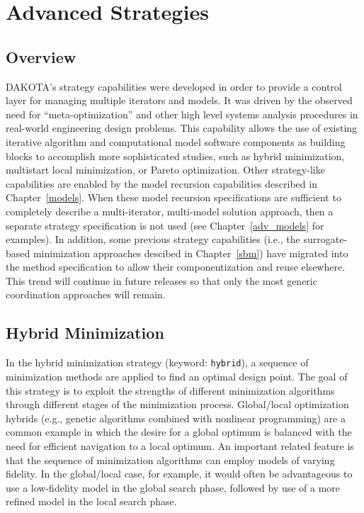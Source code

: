 \chapter{Advanced Strategies}\label{strat}

\section{Overview}\label{strat:overview}

DAKOTA's strategy capabilities were developed in order to provide a
control layer for managing multiple iterators and models. It was
driven by the observed need for ``meta-optimization'' and other high
level systems analysis procedures in real-world engineering design
problems. This capability allows the use of existing iterative
algorithm and computational model software components as building
blocks to accomplish more sophisticated studies, such as hybrid
minimization, multistart local minimization, or Pareto optimization.
Other strategy-like capabilities are enabled by the model recursion
capabilities described in Chapter~\ref{models}.  When these model
recursion specifications are sufficient to completely describe a
multi-iterator, multi-model solution approach, then a separate
strategy specification is not used (see Chapter~\ref{adv_models} for
examples).  In addition, some previous strategy capabilities (i.e.,
the surrogate-based minimization approaches descibed in
Chapter~\ref{sbm}) have migrated into the method specification to
allow their componentization and reuse elsewhere.  This trend will
continue in future releases so that only the most generic coordination
approaches will remain.

\section{Hybrid Minimization}\label{strat:hybrid}

In the hybrid minimization strategy (keyword: \texttt{hybrid}), a
sequence of minimization methods are applied to find an optimal design
point. The goal of this strategy is to exploit the strengths of
different minimization algorithms through different stages of the
minimization process. Global/local optimization hybrids (e.g., genetic
algorithms combined with nonlinear programming) are a common example
in which the desire for a global optimum is balanced with the need for
efficient navigation to a local optimum. An important related feature
is that the sequence of minimization algorithms can employ models of
varying fidelity. In the global/local case, for example, it would
often be advantageous to use a low-fidelity model in the global search
phase, followed by use of a more refined model in the local search
phase.


